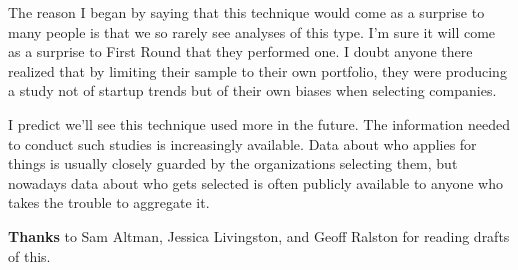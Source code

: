 The reason I began by saying that this technique would come as a
surprise to many people is that we so rarely see analyses of this type.
I'm sure it will come as a surprise to First Round that they performed
one. I doubt anyone there realized that by limiting their sample to
their own portfolio, they were producing a study not of startup trends
but of their own biases when selecting companies.

I predict we'll see this technique used more in the future. The
information needed to conduct such studies is increasingly available.
Data about who applies for things is usually closely guarded by the
organizations selecting them, but nowadays data about who gets selected
is often publicly available to anyone who takes the trouble to aggregate
it.


\textbf{Thanks} to Sam Altman, Jessica Livingston, and Geoff Ralston for
reading drafts of this.